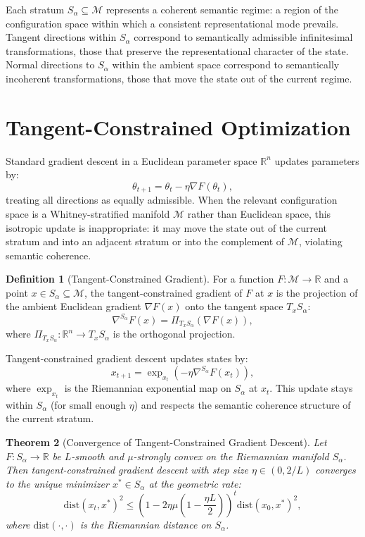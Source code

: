 \documentclass[12pt, a4paper, openany]{book}
\theoremstyle{plain}
\newtheorem{theorem}{Theorem}[chapter]
\theoremstyle{definition}
\newtheorem{definition}[theorem]{Definition}
\theoremstyle{remark}
\begin{document}
Each stratum $S_\alpha \subseteq \mathcal{M}$ represents a coherent semantic regime: a region of the configuration space within which a consistent representational mode prevails. Tangent directions within $S_\alpha$ correspond to semantically admissible infinitesimal transformations, those that preserve the representational character of the state. Normal directions to $S_\alpha$ within the ambient space correspond to semantically incoherent transformations, those that move the state out of the current regime.

\section{Tangent-Constrained Optimization}

Standard gradient descent in a Euclidean parameter space $\mathbb{R}^n$ updates parameters by:
\[
\theta_{t+1} = \theta_t - \eta \nabla F(\theta_t),
\]
treating all directions as equally admissible. When the relevant configuration space is a Whitney-stratified manifold $\mathcal{M}$ rather than Euclidean space, this isotropic update is inappropriate: it may move the state out of the current stratum and into an adjacent stratum or into the complement of $\mathcal{M}$, violating semantic coherence.

\begin{definition}[Tangent-Constrained Gradient]
For a function $F: \mathcal{M} \to \mathbb{R}$ and a point $x \in S_\alpha \subseteq \mathcal{M}$, the tangent-constrained gradient of $F$ at $x$ is the projection of the ambient Euclidean gradient $\nabla F(x)$ onto the tangent space $T_x S_\alpha$:
\[
\nabla^{S_\alpha} F(x) = \Pi_{T_x S_\alpha}(\nabla F(x)),
\]
where $\Pi_{T_x S_\alpha}: \mathbb{R}^n \to T_x S_\alpha$ is the orthogonal projection.
\end{definition}

Tangent-constrained gradient descent updates states by:
\[
x_{t+1} = \exp_{x_t}\!\left(-\eta \nabla^{S_\alpha} F(x_t)\right),
\]
where $\exp_{x_t}$ is the Riemannian exponential map on $S_\alpha$ at $x_t$. This update stays within $S_\alpha$ (for small enough $\eta$) and respects the semantic coherence structure of the current stratum.

\begin{theorem}[Convergence of Tangent-Constrained Gradient Descent]
Let $F: S_\alpha \to \mathbb{R}$ be $L$-smooth and $\mu$-strongly convex on the Riemannian manifold $S_\alpha$. Then tangent-constrained gradient descent with step size $\eta \in (0, 2/L)$ converges to the unique minimizer $x^* \in S_\alpha$ at the geometric rate:
\[
\mathrm{dist}(x_t, x^*)^2 \leq \left(1 - 2\eta\mu\left(1 - \frac{\eta L}{2}\right)\right)^t \mathrm{dist}(x_0, x^*)^2,
\]
where $\mathrm{dist}(\cdot, \cdot)$ is the Riemannian distance on $S_\alpha$.
\end{theorem}
\end{document}
